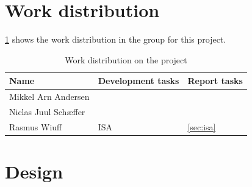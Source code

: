 \documentclass[a4paper, english]{article}
\numberwithin{equation}{section}
\begin{document}
\section{Work distribution}
\cref{tbl:ansvar} shows the work distribution in the group for this project.
\begin{table}[H]
    \centering
    \caption{Work distribution on the project}\label{tbl:ansvar}
    \begin{tabular}{lll}
        \toprule
        Name                 & Development tasks & Report tasks   \\
        \midrule
        Mikkel Arn Andersen  &                   &                \\
        Niclas Juul Schæffer &                   &                \\
        Rasmus Wiuff         & ISA               & \cref{sec:isa} \\
        \bottomrule
    \end{tabular}
\end{table}
\section{Design}
\end{document}
